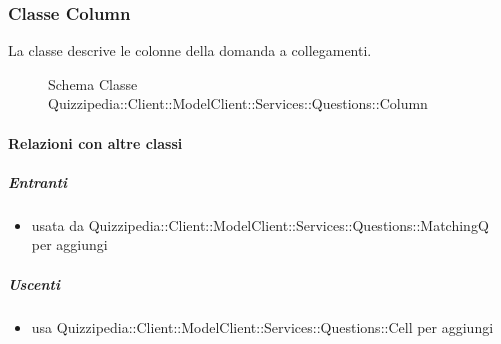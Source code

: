 \subsubsection{Classe Column}
La classe descrive le colonne della domanda a collegamenti.
\begin{figure}[H]
\centering
\noindent{}
\caption[Schema Classe Column]{Schema Classe Quizzipedia::Client::ModelClient::Services::Questions::Column}
\end{figure}
\paragraph{Relazioni con altre classi}
\subparagraph{Entranti}
\begin{itemize}
\item usata da Quizzipedia::Client::ModelClient::Services::Questions::MatchingQ per aggiungi
\end{itemize}
\subparagraph{Uscenti}
\begin{itemize}
\item usa Quizzipedia::Client::ModelClient::Services::Questions::Cell per aggiungi
\end{itemize}
